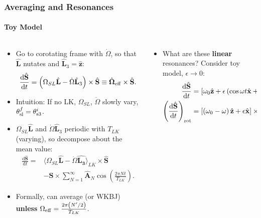 \documentclass[dvipsnames, 8pt]{beamer}
\newcommand*{\rd}[2]{\frac{\mathrm{d}#1}{\mathrm{d}#2}}
\newcommand*{\bm}[1]{\boldsymbol{\mathbf{#1}}}
\newcommand*{\uv}[1]{\hat{\bm{#1}}}
\newcommand*{\ev}[1]{\langle#1\rangle}
\newcommand*{\p}[1]{\left(#1\right)}
\newcommand*{\s}[1]{\left[#1\right]}
\begin{document}
\begin{frame}
    \frametitle{Averaging and Resonances}
    \framesubtitle{Toy Model}

    \begin{columns}
        \begin{column}{0.5\textwidth}
            \begin{itemize}
                \item Go to corotating frame with $\dot{\Omega}$, so that
                    $\uv{L}$ nutates and $\uv{L}_3 = \uv{z}$:
                    \begin{equation}
                        \rd{\uv{S}}{t} = \p{\Omega_{SL} \uv{L}
                            - \dot{\Omega} \uv{L}_3} \times \uv{S}
                            \equiv \uv{\Omega}_{\rm eff} \times \uv{S}.
                    \end{equation}

                \item Intuition: If no LK, $\Omega_{SL}$, $\dot{\Omega}$ slowly
                    vary, $\theta_{\rm sl}^f = \theta_{\rm s3}^i$.

                \item $\Omega_{SL}\uv{L}$ and $\dot{\Omega}\uv{L}_3$ periodic
                    with $T_{LK}$ (varying), so decompose about the mean value:
                    \begin{align}
                        \rd{\uv{S}}{t} ={}&
                            \ev{\Omega_{SL}\uv{L} - \dot{\Omega} \uv{L_3}}_{LK}
                                \times \uv{S}\nonumber\\
                            &- \bm{S} \times \sum\limits_{N = 1}^\infty \uv{A}_N
                                \cos \p{\frac{2\pi N t}{T_{LK}}}.
                    \end{align}

                \item Formally, can average (or WKBJ) \textbf{unless}
                    $\Omega_{\rm eff} = \frac{2\pi \p{N' / 2}}{T_{LK}}$.
            \end{itemize}
        \end{column}
        \begin{column}{0.5\textwidth}
            \begin{itemize}
                \item What are these \textbf{linear} resonances? Consider toy
                    model, $\epsilon \to 0$:
                    \begin{align}
                        \rd{\uv{S}}{t} &= \s{\omega_0 \uv{z}
                            + \epsilon\p{\cos \omega t \uv{x} + \sin
                            \omega t \uv{y}}} \times \uv{S},\\
                        \p{\rd{\uv{S}}{t}}_{\rm rot} &=
                            \s{\p{\omega_0 - \omega}\uv{z} + \epsilon
                                \uv{x}} \times \uv{S}.
                    \end{align}


\end{itemize}
\end{column}
\end{columns}
\end{frame}
\end{document}
